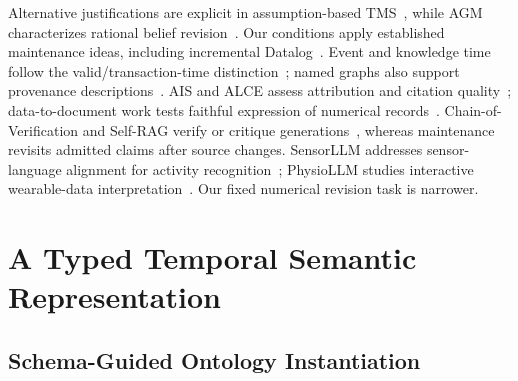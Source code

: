 \documentclass[runningheads]{llncs}
\begin{document}
Alternative justifications are explicit in assumption-based TMS~\cite{dekleer1986},
while AGM characterizes rational belief revision~\cite{agm1985}. Our conditions
apply established maintenance ideas, including incremental Datalog~\cite{motik2015}.
Event and knowledge time follow the valid/transaction-time distinction~\cite{jensen1999};
named graphs also support provenance descriptions~\cite{carroll2005}.
AIS and ALCE assess attribution and citation quality~\cite{rashkin2023,gao2023};
data-to-document work tests faithful expression of numerical records~\cite{wiseman2017}.
Chain-of-Verification and Self-RAG verify or critique generations~\cite{dhuliawala2024,asai2024},
whereas maintenance revisits admitted claims after source changes.
SensorLLM addresses sensor-language alignment for activity recognition~\cite{sensorllm2025};
PhysioLLM studies interactive wearable-data interpretation~\cite{physiollm2024}.
Our fixed numerical revision task is narrower.






\section{A Typed Temporal Semantic Representation}
\label{sec:representation}

\subsection{Schema-Guided Ontology Instantiation}
\end{document}
